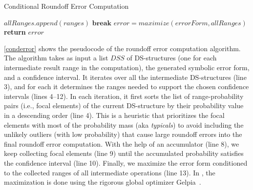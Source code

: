 \begin{algorithm}[tb]
	\caption{Conditional Roundoff Error Computation}\label{conderror}
	\begin{algorithmic}[1]
		
				\State $allRanges.append(ranges)$
				\State $\mathbf{break}$
			\EndIf
		\EndFor
		\EndFor
		\State $error=maximize(errorForm, allRanges)$
		\State \textbf{return} $error$
		\EndFunction
	\end{algorithmic}
\end{algorithm}


\cref{conderror} shows the pseudocode of the roundoff error computation
algorithm.
%
The algorithm takes as input a list $DSS$ of DS-structures (one for each
intermediate result range in the computation), the generated symbolic error
form, and a confidence interval.
%
It iterates over all the intermediate DS-structures (line 3), and for each it
determines the ranges needed to support the chosen confidence intervals (lines
4--12).
%
In each iteration, it first sorts the list of range-probability pairs (i.e.,
focal elements) of the current DS-structure by their probability value in a
descending order (line 4).
%
This is a heuristic that prioritizes the focal elements with most of the
probability mass (aka \emph{typicals}) to avoid including the unlikely outliers
(with low probability) that cause large roundoff errors into the final roundoff
error computation.
%
With the help of an accumulator (line 8), we keep collecting focal elements
(line 9) until the accumulated probability satisfies the confidence interval
(line 10).
%
Finally, we maximize the error form conditioned to the collected ranges of all
intermediate operations (line 13).
%
In \Tool, the maximization is done using the rigorous global optimizer
Gelpia~\cite{gelpia}.



